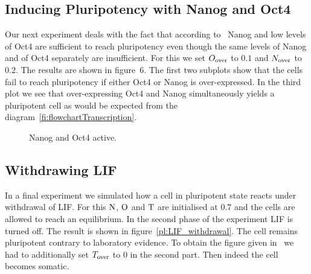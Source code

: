 \subsection{Inducing Pluripotency with Nanog and Oct4}

Our next experiment deals with the fact that according to~\cite{Olariu2016} Nanog and low levels
of Oct4 are sufficient to reach pluripotency even though the same levels of Nanog and of Oct4 separately
are insufficient. For this we set $O_\text{over}$ to $0.1$ and $N_\text{over}$ to $0.2$. The results are shown in
figure~6. The first two subplots show that the cells fail to reach pluripotency if either Oct4 or Nanog is over-expressed.
In the third plot we see that over-expressing Oct4 and Nanog simultaneously yields a pluripotent cell
as would be expected from the diagram~\ref{fi:flowchartTranscription}.


\begin{figure}
\centering
\begin{minipage}[t]{0.3\textwidth}
\centering
\graphicspath{{../Plots/}}

\end{minipage}
\hfill
\centering
\begin{minipage}[t]{0.3\textwidth}
\centering
\graphicspath{{../Plots/}}

\end{minipage}
\hspace*{0.2cm}
\begin{minipage}[t]{0.3\textwidth}
\centering
\graphicspath{{../Plots/}}

\end{minipage}
\caption{Nanog and Oct4 active.}
\label{pl:NO}
\end{figure}


\newpage

\subsection{Withdrawing LIF}

In a final experiment we simulated how a cell in pluripotent state reacts under withdrawal of LIF.
For this $\text{N}$, $\text{O}$ and $\text{T}$ are initialised at $0.7$ and the cells are allowed to reach an equilibrium.
In the second phase of the experiment LIF is turned off. The result is shown in figure~\ref{pl:LIF_withdrawal}.
The cell remains pluripotent contrary to laboratory evidence.
To obtain the figure given in~\cite{Olariu2016} we had to additionally set $T_\text{over}$ to $0$
in the second part. Then indeed the cell becomes somatic.

